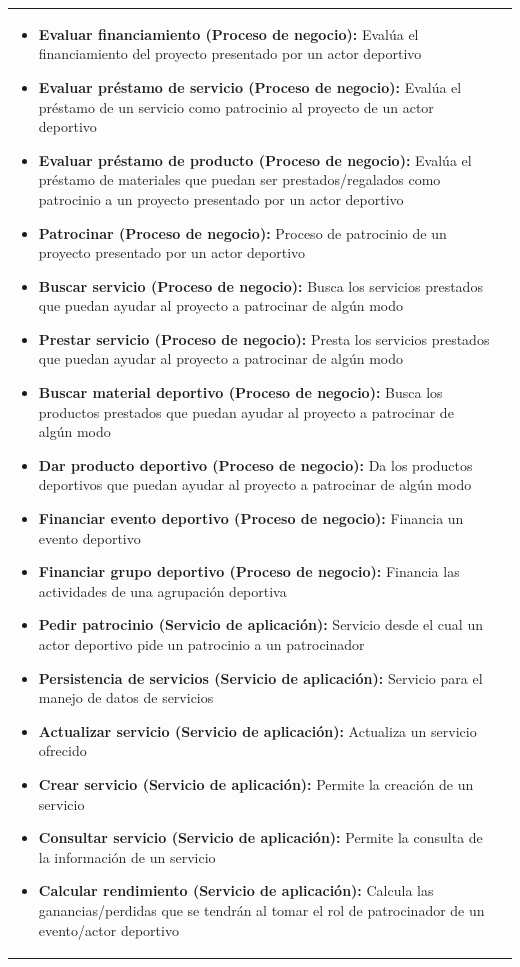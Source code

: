 \begin{table}[!htb]
\begin{center}
{\begin{tabular}{|p{7cm}|p{4cm}|}
\begin{itemize}
				\item \textbf{Evaluar financiamiento (Proceso de negocio):} Evalúa el financiamiento del proyecto presentado por un actor deportivo
				\item \textbf{Evaluar préstamo de servicio (Proceso de negocio):} Evalúa el préstamo de un servicio como patrocinio al proyecto de un actor deportivo
				\item \textbf{Evaluar préstamo de producto (Proceso de negocio):} Evalúa el préstamo de materiales que puedan ser prestados/regalados como patrocinio a un proyecto presentado por un actor deportivo
				\item \textbf{Patrocinar (Proceso de negocio):} Proceso de patrocinio de un proyecto presentado por un actor deportivo
				\item \textbf{Buscar servicio (Proceso de negocio):} Busca los servicios prestados que puedan ayudar al proyecto a patrocinar de algún modo
				\item \textbf{Prestar servicio (Proceso de negocio):} Presta los servicios prestados que puedan ayudar al proyecto a patrocinar de algún modo
				\item \textbf{Buscar material deportivo (Proceso de negocio):} Busca los productos prestados que puedan ayudar al proyecto a patrocinar de algún modo
				\item \textbf{Dar producto deportivo (Proceso de negocio):} Da los productos deportivos que puedan ayudar al proyecto a patrocinar de algún modo
				\item \textbf{Financiar evento deportivo (Proceso de negocio):} Financia un evento deportivo
				\item \textbf{Financiar grupo deportivo (Proceso de negocio):} Financia las actividades de una agrupación deportiva
				\item \textbf{Pedir patrocinio (Servicio de aplicación):} Servicio desde el cual un actor deportivo pide un patrocinio a un patrocinador
				\item \textbf{Persistencia de servicios (Servicio de aplicación):} Servicio para el manejo de datos de servicios
				\item \textbf{Actualizar servicio (Servicio de aplicación):} Actualiza un servicio ofrecido
				\item \textbf{Crear servicio (Servicio de aplicación):} Permite la creación de un servicio
				\item \textbf{Consultar servicio (Servicio de aplicación):} Permite la consulta de la información de un servicio
				\item \textbf{Calcular rendimiento (Servicio de aplicación):} Calcula las ganancias/perdidas que se tendrán al tomar el rol de patrocinador de un evento/actor deportivo

\end{itemize}
\end{tabular}}
\end{center}
\end{table}
